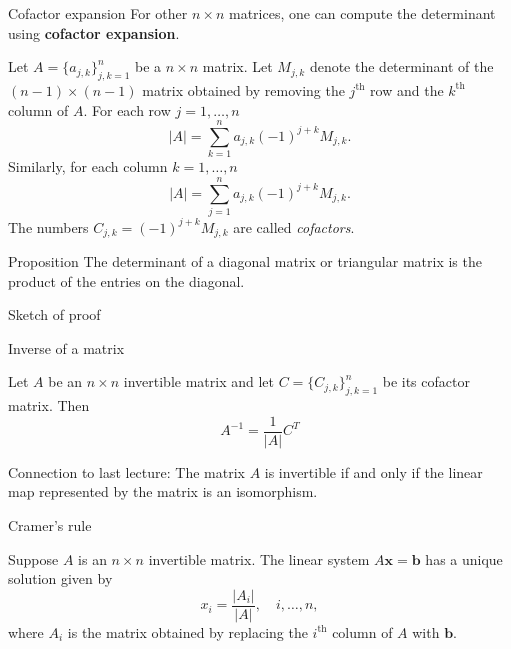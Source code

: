 \documentclass [aspectratio=169]{beamer}
\newcommand{\bx}{{\mathbf{x}}}
\newcommand{\inv}{{-1}}
\begin{document}
\begin{frame}{Cofactor expansion}
For other $n \times n$ matrices, one can compute the determinant using \textbf{\textcolor{deptoran}{cofactor expansion}}.

\begin{definition}
Let $A = \{ a_{j,k}\}_{j,k=1}^n$ be a $n\times n$ matrix. Let $M_{j,k}$ denote the determinant of the $(n-1) \times (n-1)$ matrix obtained by removing the $j^\text{th}$ row and the $k^\text{th}$ column of $A$. For each row $j=1,\ldots,n$
\begin{equation*}
    |A| = \sum_{k=1}^n a_{j,k} (-1)^{j+k} M_{j,k}.
\end{equation*}
Similarly, for each column $k=1,\ldots,n$
\begin{equation*}
    |A| = \sum_{j=1}^n a_{j,k} (-1)^{j+k} M_{j,k}.
\end{equation*}
The numbers $C_{j,k}=(-1)^{j+k} M_{j,k}$ are called \emph{cofactors}.
\end{definition}
\end{frame}


\begin{frame}
\begin{exampleblock}{Proposition}
The determinant of a diagonal matrix or triangular matrix is the product of the entries on the diagonal.
\end{exampleblock}
\begin{block}{Sketch of proof}
\vspace{4cm}
\end{block}

\end{frame}


\begin{frame}{Inverse of a matrix}
\begin{theorem}
Let $A$ be an $n \times n$ invertible matrix and let $C=\{C_{j,k}\}_{j,k=1}^n$ be its cofactor matrix. Then
\begin{equation*}
    A^\inv = \frac{1}{|A|} C^T
\end{equation*}
\end{theorem}

\vspace{1em}

Connection to last lecture: The matrix $A$ is invertible if and only if the linear map represented by the matrix is an isomorphism.
\end{frame}

\begin{frame}{Cramer's rule}
\begin{corollary}
Suppose $A$ is an $n \times n$ invertible matrix. The linear system $A\bx = \mathbf{b}$ has a unique solution given by
\begin{equation*}
    x_i = \frac{|A_i|}{|A|}, \quad i, \ldots, n,
\end{equation*}
where $A_i$ is the matrix obtained by replacing the $i^\text{th}$ column of $A$ with $\mathbf{b}$.
\end{corollary}
\end{frame}
\end{document}
